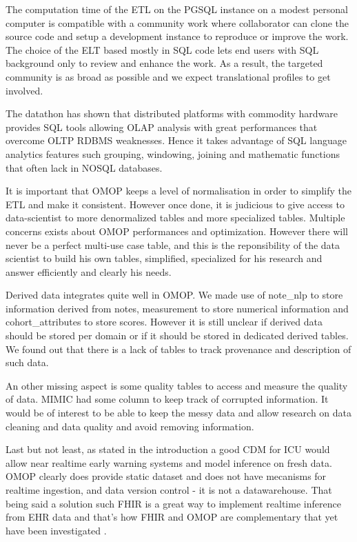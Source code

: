 The computation time of the ETL on the PGSQL instance on a modest personal
computer is compatible with a community work where collaborator can clone the
source code and setup a development instance to reproduce or improve the work.
The choice of the ELT based mostly in SQL code lets end users with SQL
background only to review and enhance the work. As a result, the targeted
community is as broad as possible and we expect translational profiles to get
involved.

The datathon has shown that distributed platforms with commodity hardware
provides SQL tools allowing OLAP analysis with great performances that overcome
OLTP RDBMS weaknesses. Hence it takes advantage of SQL language analytics
features such grouping, windowing, joining and mathematic functions that often
lack in NOSQL databases.

It is important that OMOP keeps a level of normalisation in order to simplify
the ETL and make it consistent. However once done, it is judicious to give
access to data-scientist to more denormalized tables and more specialized
tables. Multiple concerns exists about OMOP performances and optimization.
However there will never be a perfect multi-use case table, and this is the
reponsibility of the data scientist to build his own tables, simplified,
specialized for his research and answer efficiently and clearly his needs.

Derived data integrates quite well in OMOP. We made use of note\_nlp to store
information derived from notes, measurement to store numerical information and
cohort\_attributes to store scores. However it is still unclear if derived data
should be stored per domain or if it should be stored in dedicated derived
tables. We found out that there is a lack of tables to track provenance and
description of such data.

An other missing aspect is some quality tables to access and measure the
quality of data. MIMIC had some column to keep track of corrupted information.
It would be of interest to be able to keep the messy data and allow research on
data cleaning and data quality and avoid removing information.

Last but not least, as stated in the introduction a good CDM for ICU would
allow near realtime early warning systems and model inference on fresh data.
OMOP clearly does provide static dataset and does not have mecanisms for
realtime ingestion, and data version control - it is not a datawarehouse. That
being said a solution such FHIR is a great way to implement realtime inference
from EHR data and that's how FHIR and OMOP are complementary that yet have been
investigated \cite{gatech}.
